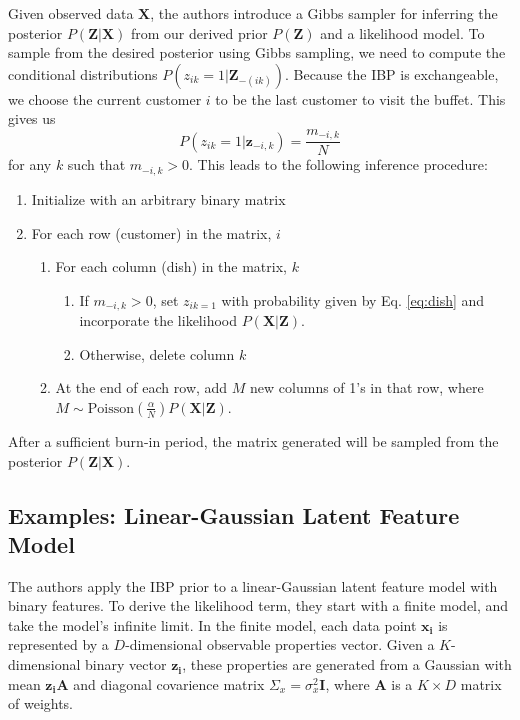 \documentclass[twoside]{article}
\begin{document}
Given observed data $\mathbf{X}$, the authors introduce a Gibbs sampler for inferring the posterior $P(\mathbf{Z | X})$ from our derived prior $P(\mathbf{Z})$ and a likelihood model. To sample from the desired posterior using Gibbs sampling, we need to compute the conditional distributions $P(z_{ik} = 1| \mathbf{Z}_{-(ik)})$. Because the IBP is exchangeable, we choose the current customer $i$ to be the last customer to visit the buffet. This gives us
\begin{equation}
    P(z_{ik} = 1 | \mathbf{z}_{-i, k}) = \frac{m_{-i, k}}{N}
    \label{eq:dish}
\end{equation}
for any $k$ such that $m_{-i, k} > 0$. This leads to the following inference procedure:
\begin{enumerate}
  \item Initialize with an arbitrary binary matrix 
  \item For each row (customer) in the matrix, $i$ 
    \begin{enumerate}
        \item For each column (dish) in the matrix, $k$
            \begin{enumerate}
                \item If $m_{-i, k} > 0$,  set $z_{ik = 1}$ with probability given by Eq. \ref{eq:dish} and incorporate the likelihood $P(\mathbf{X|Z})$.
                \item Otherwise, delete column $k$
            \end{enumerate}
        \item At the end of each row, add $M$ new columns of 1's in that row, where $M \sim \text{Poisson}(\frac{\alpha}{N}) P(\mathbf{X|Z})$.
    \end{enumerate}
\end{enumerate}

After a sufficient burn-in period, the matrix generated will be sampled from the posterior $P(\mathbf{Z|X})$.

\subsection{Examples: Linear-Gaussian Latent Feature Model}
The authors apply the IBP prior to a linear-Gaussian latent feature model with binary features. To derive the likelihood term, they start with a finite model, and take the model's infinite limit. In the finite model, each data point $\mathbf{x_i}$ is represented by a $D$-dimensional observable properties vector. Given a $K$-dimensional binary vector $\mathbf{z_i}$, these properties are generated from a Gaussian with mean $\mathbf{z_iA}$ and diagonal covarience matrix $\Sigma_x = \sigma_x^2\mathbf{I}$, where $\mathbf{A}$ is a $K \times D$ matrix of weights.
\end{document}
